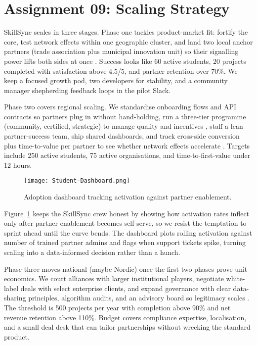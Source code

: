 \section*{Assignment 09: Scaling Strategy}

SkillSync scales in three stages. Phase one tackles product-market fit: fortify the core, test network effects within one geographic cluster, and land two local anchor partners (trade association plus municipal innovation unit) so their signalling power lifts both sides at once \citep{Choudary2016,Reillier2017}. Success looks like 60 active students, 20 projects completed with satisfaction above 4.5/5, and partner retention over 70\%. We keep a focused growth pod, two developers for stability, and a community manager shepherding feedback loops in the pilot Slack.

Phase two covers regional scaling. We standardise onboarding flows and API contracts so partners plug in without hand-holding, run a three-tier programme (community, certified, strategic) to manage quality and incentives \citep{HagiuWright2013}, staff a lean partner-success team, ship shared dashboards, and track cross-side conversion plus time-to-value per partner to see whether network effects accelerate \citep{ShapiroVarian1999,Lecture12}. Targets include 250 active students, 75 active organisations, and time-to-first-value under 12 hours.

\begin{figure}[H]
  \centering
  \texttt{[image: Student-Dashboard.png]}
  \caption{Adoption dashboard tracking activation against partner enablement.}
  \label{fig:scaling-dashboard}
\end{figure}

Figure~\ref{fig:scaling-dashboard} keeps the SkillSync crew honest by showing how activation rates inflect only after partner enablement becomes self-serve, so we resist the temptation to sprint ahead until the curve bends. The dashboard plots rolling activation against number of trained partner admins and flags when support tickets spike, turning scaling into a data-informed decision rather than a hunch.

Phase three moves national (maybe Nordic) once the first two phases prove unit economics. We court alliances with larger institutional players, negotiate white-label deals with select enterprise clients, and expand governance with clear data-sharing principles, algorithm audits, and an advisory board so legitimacy scales \citep{Srnicek2017,Zuboff2019}. The threshold is 500 projects per year with completion above 90\% and net revenue retention above 110\%. Budget covers compliance expertise, localisation, and a small deal desk that can tailor partnerships without wrecking the standard product.


